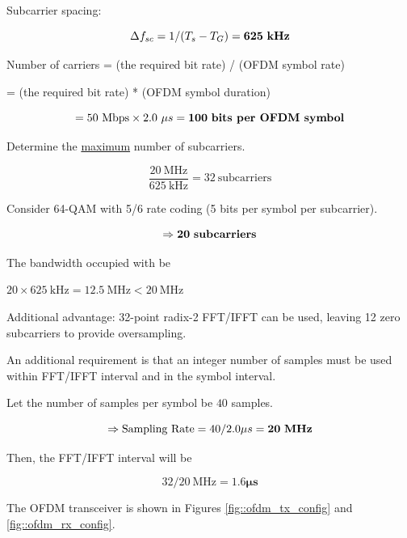 \documentclass[fleqn]{article}
\begin{document}
\begin{enumerate}
		Subcarrier spacing:
		
		\begin{equation*}
			{\Delta}f_{sc} = 1/(T_s - T_G) = \mathbf{625\ \text{\textbf{kHz}}}
		\end{equation*}
		
		Number of carriers = (the required bit rate) / (OFDM symbol rate)
		
		= (the required bit rate) * (OFDM symbol duration)
		 
		\begin{equation*}
			= 50\ \text{Mbps} \times 2.0\ {\mu}s = \mathbf{100\ \text{\textbf{bits per OFDM symbol}}}
		\end{equation*}
		
		Determine the \underline{maximum} number of subcarriers.
		
		\begin{equation*}
			\frac{20\ \text{MHz}}{625\ \text{kHz}} = 32\ \text{subcarriers}
		\end{equation*}
		
		Consider 64-QAM with 5/6 rate coding (5 bits per symbol per subcarrier).
		
		\begin{equation*}
			\Rightarrow \mathbf{20}\ \text{\textbf{subcarriers}}
		\end{equation*}
		
		The bandwidth occupied with be
		
		$20 \times 625\ \text{kHz} = 12.5\ \text{MHz} < 20\ \text{MHz}$
		
		Additional advantage: 32-point radix-2 FFT/IFFT can be used, leaving 12 zero subcarriers to provide oversampling.
		
		An additional requirement is that an integer number of samples must be used within FFT/IFFT interval and in the symbol interval.
		
		Let the number of samples per symbol be $40$ samples.
		
		\begin{equation*}
			\Rightarrow \text{Sampling Rate} = 40/2.0{\mu}s = \mathbf{20}\ \text{\textbf{MHz}}
		\end{equation*}
		
		Then, the FFT/IFFT interval will be
		
		\begin{equation*}
			32/20\ \text{MHz} = \mathbf{1.6 {\mu}s}
		\end{equation*}		
		
		The OFDM transceiver is shown in Figures \ref{fig::ofdm_tx_config} and \ref{fig::ofdm_rx_config}.
		

\end{enumerate}
\end{document}
